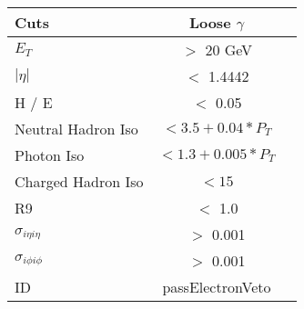 \documentclass[landscape]{article}
\begin{document}
\begin{small}
\begin{center}
    \vspace{10 mm}

    \begin{tabular}{ | l | c | c | }
      \hline \hline
      Cuts & Loose $\gamma$ \\ \hline
      $E_{T}$ & $>$ 20 GeV \\ \hline
      $|\eta|$ & $<$ 1.4442 \\ \hline
      H / E & $<$ 0.05 \\ \hline
      Neutral Hadron Iso & $< 3.5 + 0.04*P_{T}$ \\ \hline
      Photon Iso & $< 1.3 + 0.005*P_{T}$ \\ \hline
      Charged Hadron Iso & $< 15$ \\ \hline
      R9 & $<$ 1.0 \\ \hline
      $\sigma_{i\eta i\eta}$ & $>$ 0.001 \\ \hline
      $\sigma_{i\phi i\phi}$ & $>$ 0.001 \\ \hline
      ID & passElectronVeto \\
      \hline \hline
    \end{tabular}

    \vspace{10 mm}


\end{center}
\end{small}
\end{document}
